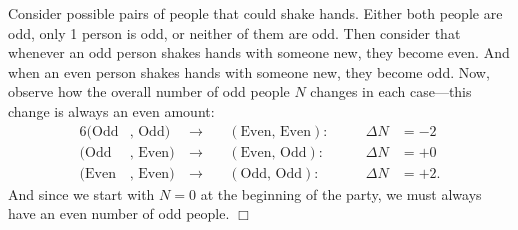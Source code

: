 \begin{solution}
    Consider possible pairs of people that could shake hands. Either both people are odd, only 1 person is odd, or neither of them are odd. Then consider that whenever an odd person shakes hands with someone new, they become even. And when an even person shakes hands with someone new, they become odd. Now, observe how the overall number of odd people $N$ changes in each case---this change is always an even amount:
    \begin{alignat*}{6}
        (\text{Odd} &,\,\text{Odd})& \ \rightarrow&& \ (\text{Even} ,\,\text{Even})\!: \quad &&\Delta N &{}= -2\\
        (\text{Odd} &,\,\text{Even})& \ \rightarrow&& \ (\text{Even},\,\text{Odd})\!: \quad &&\Delta N &{}= +0\\
        (\text{Even} &,\,\text{Even})& \ \rightarrow&& \ (\text{Odd},\,\text{Odd})\!: \quad &&\Delta N &{}= +2.
    \end{alignat*}
    And since we start with $N=0$ at the beginning of the party, we must always have an even number of odd people. $\Box$
\end{solution}


